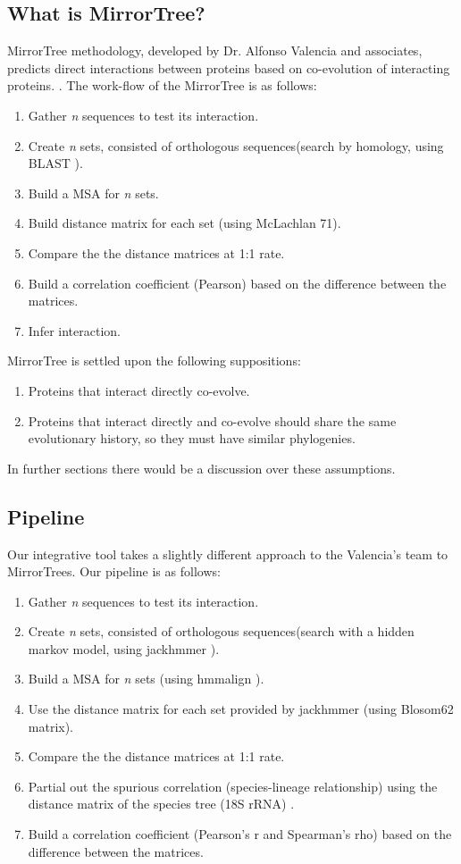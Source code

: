 \documentclass[11pt]{article}
\begin{document}
\subsection{What is MirrorTree?}
MirrorTree methodology, developed by Dr. Alfonso Valencia and associates, predicts direct interactions between proteins based on co-evolution of interacting proteins. \cite{Pazos2001}. The work-flow of the MirrorTree is as follows:
\begin{enumerate}
\setlength{\itemsep}{1pt}
	\item Gather \textit{n} sequences to test its interaction.
	\item Create \textit{n} sets, consisted of orthologous sequences(search by homology, using BLAST \cite{BLAST}).
	\item Build a MSA for \textit{n} sets.
	\item Build distance matrix for each set (using McLachlan 71).
	\item Compare the the distance matrices at 1:1 rate.
	\item Build a correlation coefficient (Pearson) based on the difference between the matrices.
	\item Infer interaction.
\end{enumerate}
MirrorTree is settled upon the following suppositions:
\begin{enumerate}
\setlength{\itemsep}{1pt}
	\item Proteins that interact directly co-evolve.
	\item Proteins that interact directly and co-evolve should share the same evolutionary history, so they must have similar phylogenies.
\end{enumerate}
In further sections there would be a discussion over these assumptions.

\subsection{Pipeline}
Our integrative tool takes a slightly different approach to the Valencia's team to MirrorTrees. Our pipeline is as follows:
\begin{enumerate}
\setlength{\itemsep}{1pt}
	\item Gather \textit{n} sequences to test its interaction.
	\item Create \textit{n} sets, consisted of orthologous sequences(search with a hidden markov model, using jackhmmer \cite{HMMER}).
	\item Build a MSA for \textit{n} sets (using hmmalign \cite{HMMER}).
	\item Use the distance matrix for each set provided by jackhmmer \cite{HMMER} (using Blosom62 matrix).
	\item Compare the the distance matrices at 1:1 rate.
	\item Partial out the spurious correlation (species-lineage relationship) using the distance matrix of the species tree (18S rRNA) \cite{Sato2005}.	
	\item Build a correlation coefficient (Pearson's r and Spearman's rho) based on the difference between the matrices.

\end{enumerate}
\end{document}
